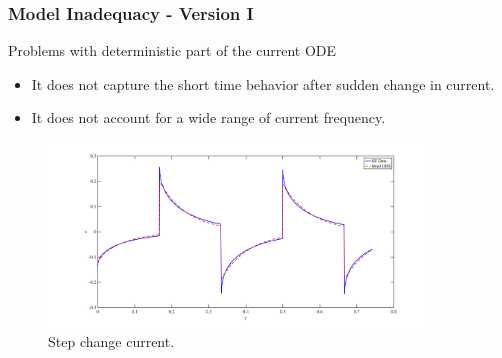 \documentclass[10pt,xcolor=dvipsnames,compress]{beamer}
\begin{document}
\begin{frame}
\frametitle{Model Inadequacy - Version I}
\vfill


\begin{block}{Problems with deterministic part of the current ODE}
\begin{itemize}
\item It does not capture the short time behavior after sudden change in current.
\item It does not account for a wide range of current frequency. 
\end{itemize}
\end{block}

\begin{figure}[h]
    \centering
    \includegraphics[trim = 1.6in 0.2in 1.6in 0.2in, clip, width=0.9\textwidth]{figs/step_optim_oldInad.png} 
    \vspace{-4mm}
\caption{Step change current.}
\end{figure}


\vfill
\end{frame}
\end{document}
